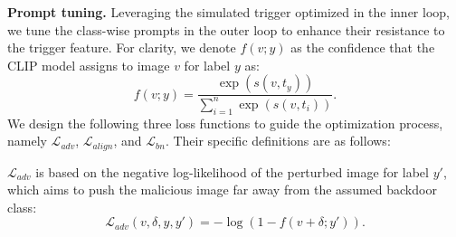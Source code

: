\textbf{Prompt tuning.}
Leveraging the simulated trigger optimized in the inner loop, we tune the class-wise prompts in the outer loop to enhance their resistance to the trigger feature. For clarity, we denote $f(v;y)$ as the confidence that the CLIP model assigns to image $v$ for label $y$ as:
\begin{equation}
    f(v;y)=\frac{\exp{(s(v, t_y))}} {\sum_{i=1}^{n} {\exp{(s(v, t_i))}}}.
\end{equation}
We design the following three loss functions to guide the optimization process, namely $\mathcal{L}_{adv}$, $\mathcal{L}_{align}$, and $\mathcal{L}_{bn}$. Their specific definitions are as follows:

 $\mathcal{L}_{adv}$ is based on the negative log-likelihood of the perturbed image for label $y'$, which aims to push the malicious image far away from the assumed backdoor class:
\begin{equation}
    \mathcal{L}_{adv}(v, \delta, y, y')=-\log(1-f(v+\delta; y')).
    \label{eq:loss_asr}
\end{equation}


